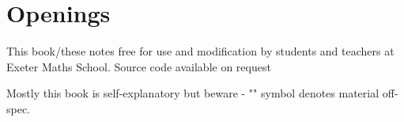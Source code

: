 \chapter{Openings}

This book/these notes free for use and modification by students and teachers at Exeter Maths School. Source code available on request


Mostly this book is self-explanatory but beware - "\piste" symbol denotes material off-spec.


